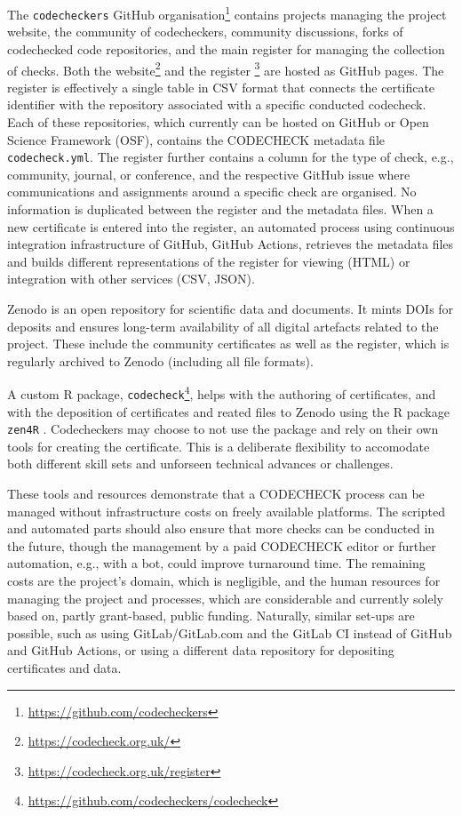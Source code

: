 \documentclass[12pt]{article}
\begin{document}
The \texttt{codecheckers} GitHub organisation\footnote{
\url{https://github.com/codecheckers}} contains projects managing the
project website, the community of codecheckers, community discussions,
forks of codechecked code repositories, and the main register for
managing the collection of checks. Both the website\footnote{
\url{https://codecheck.org.uk/}} and the register
\footnote{\url{https://codecheck.org.uk/register}} are hosted as GitHub
pages. The register is effectively a single table in CSV format that
connects the certificate identifier with the repository associated with
a specific conducted codecheck. Each of these repositories, which 
currently can be hosted on GitHub or Open Science Framework (OSF), 
contains the CODECHECK metadata file \texttt{codecheck.yml}. The register
further contains a column for the type of check, e.g., community, journal,
or conference, and the respective GitHub issue where communications and 
assignments around a specific check are organised. No information is 
duplicated between the register and the metadata files. When a new
certificate is entered into the register, an automated process using 
continuous integration infrastructure of GitHub, GitHub Actions, retrieves
the metadata files and builds different representations of the register
for viewing (HTML) or integration with other services (CSV, JSON).

Zenodo is an open repository for scientific data and documents. It
mints DOIs for deposits and ensures long-term availability of all digital
artefacts related to the project. These include the community 
certificates as well as the register, which is regularly archived to 
Zenodo \cite{codecheck_register} (including all file formats).

A custom R package, \texttt{codecheck}\footnote{
\url{https://github.com/codecheckers/codecheck}}, helps with the authoring
of certificates, and with the deposition of certificates and reated files to
Zenodo using the R package \texttt{zen4R} \cite{zen4r}.
Codecheckers may choose to not use the package and rely on their own tools
for creating the certificate. This is a deliberate flexibility to
accomodate both different skill sets and unforseen technical advances or
challenges.

These tools and resources demonstrate that a CODECHECK process can be
managed without infrastructure costs on freely available platforms.
The scripted and automated parts should also ensure that more checks can
be conducted in the future, though the management by a paid CODECHECK
editor or further automation, e.g., with a bot, could improve turnaround time.
The remaining costs are the project's domain, which is negligible, and
the human resources for managing the project and processes, which are
considerable and currently solely based on, partly grant-based, public funding.
Naturally, similar set-ups are possible, such as using GitLab/GitLab.com 
and the GitLab CI instead of GitHub and GitHub Actions, or using a different 
data repository for depositing certificates and data.
\end{document}
